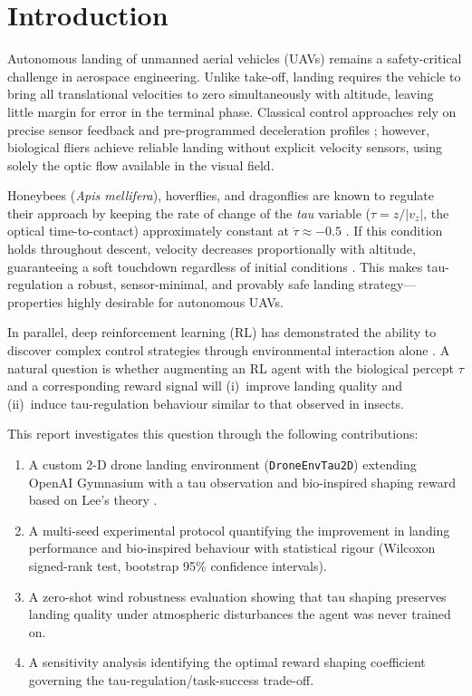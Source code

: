 \chapter{Introduction}
\label{ch:introduction}

Autonomous landing of unmanned aerial vehicles (UAVs) remains a safety-critical challenge
in aerospace engineering.
Unlike take-off, landing requires the vehicle to bring all translational velocities to zero
simultaneously with altitude, leaving little margin for error in the terminal phase.
Classical control approaches rely on precise sensor feedback and pre-programmed deceleration
profiles \cite{flores2012}; however, biological fliers achieve reliable landing without
explicit velocity sensors, using solely the optic flow available in the visual field.

Honeybees (\emph{Apis mellifera}), hoverflies, and dragonflies are known to regulate their
approach by keeping the rate of change of the \emph{tau} variable
($\tau = z / |v_z|$, the optical time-to-contact) approximately constant at
$\dot{\tau} \approx -0.5$ \cite{lee1976, wagner1982}.
If this condition holds throughout descent, velocity decreases proportionally with altitude,
guaranteeing a soft touchdown regardless of initial conditions \cite{lee1976}.
This makes tau-regulation a robust, sensor-minimal, and provably safe landing
strategy---properties highly desirable for autonomous UAVs.

In parallel, deep reinforcement learning (RL) has demonstrated the ability to discover
complex control strategies through environmental interaction alone \cite{schulman2017ppo}.
A natural question is whether augmenting an RL agent with the biological percept $\tau$
and a corresponding reward signal will (i)~improve landing quality and
(ii)~induce tau-regulation behaviour similar to that observed in insects.

This report investigates this question through the following contributions:
\begin{enumerate}
  \item A custom 2-D drone landing environment (\texttt{DroneEnvTau2D}) extending
        OpenAI Gymnasium \cite{towers2024} with a tau observation and bio-inspired
        shaping reward based on Lee's theory \cite{lee1976}.
  \item A multi-seed experimental protocol quantifying the improvement in landing
        performance and bio-inspired behaviour with statistical rigour (Wilcoxon
        signed-rank test, bootstrap 95\% confidence intervals).
  \item A zero-shot wind robustness evaluation showing that tau shaping preserves
        landing quality under atmospheric disturbances the agent was never trained on.
  \item A sensitivity analysis identifying the optimal reward shaping coefficient
        governing the tau-regulation/task-success trade-off.
\end{enumerate}

